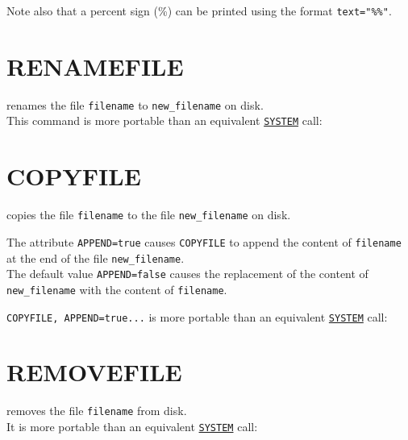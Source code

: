 Note also that a percent sign (\%) can be printed using the format
\verb|text="%%"|. 


\section{RENAMEFILE}
\label{sec:renamefile}
renames the file \texttt{filename} to \texttt{new\_filename} on disk. \\
This command is more portable than an equivalent
\hyperref[sec:system]{\texttt{SYSTEM}} call: 

\section{COPYFILE}
\label{sec:copyfile}
copies the file \texttt{filename} to the file \texttt{new\_filename} on disk.

The attribute \texttt{APPEND=true} causes \texttt{COPYFILE} to append
the content of \texttt{filename} at the end of the file
\texttt{new\_filename}.\\ 
The default value \texttt{APPEND=false} causes the replacement of the
content of \texttt{new\_filename} with the content of \texttt{filename}.

\texttt{COPYFILE, APPEND=true...} is more portable than an equivalent
\hyperref[sec:system]{\texttt{SYSTEM}} call: 

\section{REMOVEFILE}
\label{sec:removefile}
removes the file \texttt{filename} from disk. \\
It is more portable than an equivalent \hyperref[sec:system]{\texttt{SYSTEM}} call: 

